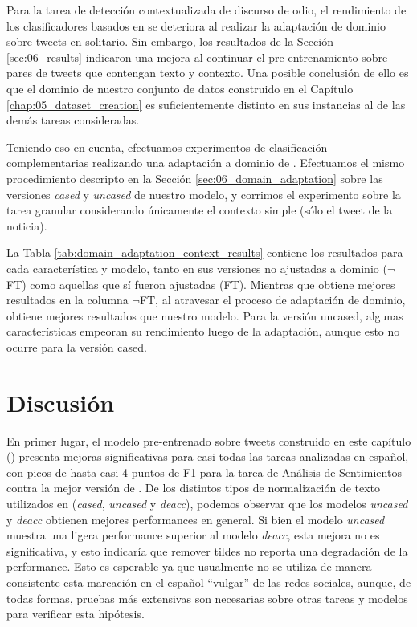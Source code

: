 Para la tarea de detección contextualizada de discurso de odio, el rendimiento de los clasificadores basados en \beto{} se deteriora al realizar la adaptación de dominio sobre tweets en solitario. Sin embargo, los resultados de la Sección \ref{sec:06_results} indicaron una mejora al continuar el pre-entrenamiento sobre pares de tweets que contengan texto y contexto. Una posible conclusión de ello es que el dominio de nuestro conjunto de datos construido en el Capítulo \ref{chap:05_dataset_creation} es suficientemente distinto en sus instancias al de las demás tareas consideradas.

Teniendo eso en cuenta, efectuamos experimentos de clasificación complementarias realizando una adaptación a dominio de \robertuito{}. Efectuamos el mismo procedimiento descripto en la Sección \ref{sec:06_domain_adaptation} sobre las versiones \emph{cased} y \emph{uncased} de nuestro modelo, y corrimos el experimento sobre la tarea granular considerando únicamente el contexto simple (sólo el tweet de la noticia).

La Tabla \ref{tab:domain_adaptation_context_results} contiene los resultados para cada característica y modelo, tanto en sus versiones no ajustadas a dominio ($\neg$FT) como aquellas que sí fueron ajustadas (FT). Mientras que \robertuito{} obtiene mejores resultados en la columna $\neg$FT, al atravesar el proceso de adaptación de dominio, \beto{} obtiene mejores resultados que nuestro modelo. Para la versión uncased, algunas características empeoran su rendimiento luego de la adaptación, aunque esto no ocurre para la versión cased.


\section{Discusión}


En primer lugar, el modelo pre-entrenado sobre tweets construido en este capítulo (\robertuito{}) presenta mejoras significativas para casi todas las tareas analizadas en español, con picos de hasta casi 4 puntos de F1 para la tarea de Análisis de Sentimientos contra la mejor versión de \beto{}. De los distintos tipos de normalización de texto utilizados en \robertuito{} (\emph{cased}, \emph{uncased} y \emph{deacc}), podemos observar que los modelos \emph{uncased} y \emph{deacc} obtienen mejores performances en general. Si bien el modelo \emph{uncased} muestra una ligera performance superior al modelo \emph{deacc}, esta mejora no es significativa, y esto indicaría que remover tildes no reporta una degradación de la performance. Esto es esperable ya que usualmente no se utiliza de manera consistente esta marcación en el español ``vulgar'' de las redes sociales, aunque, de todas formas, pruebas más extensivas son necesarias sobre otras tareas y modelos para verificar esta hipótesis.


